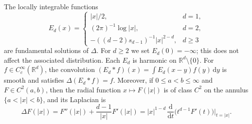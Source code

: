 \begin{proposition}\label{prop:laplacian-fundamental-solution}
The locally integrable functions
\begin{equation}\label{eq:laplacian-fundamental-solution}
 E_d(x)=\begin{cases}
 |x|/2,&d=1,\\
 (2\pi)^{-1}\log|x|,&d=2,\\
 -((d-2)s_{d-1})^{-1}|x|^{2-d},&d\geq3
 \end{cases}
\end{equation}
are fundamental solutions of $\Delta$. For $d\geq2$ we set $E_d(0)=-\infty$; this does not affect the associated distribution. Each $E_d$ is harmonic on $\mathbb R^d\setminus\{0\}$. For $f\in C_c^\infty(\mathbb R^d)$, the convolution $(E_d*f)(x)=\int E_d(x-y)f(y)\,\mathrm dy$ is smooth and satisfies $\Delta(E_d*f)=f$. Moreover, if $0\leq a<b\leq\infty$ and $F\in C^2(a,b)$, then the radial function $x\mapsto F(|x|)$ is of class $C^2$ on the annulus $\{a<|x|<b\}$, and its Laplacian is
\begin{equation}\label{eq:radial-laplacian}
 \Delta F(|x|)=F''(|x|)+\frac{d-1}{|x|}F'(|x|)=|x|^{1-d}\,\frac{\mathrm d}{\mathrm dt}\bigl(t^{d-1}F'(t)\bigr)\Big|_{t=|x|}.
\end{equation}
\end{proposition}
